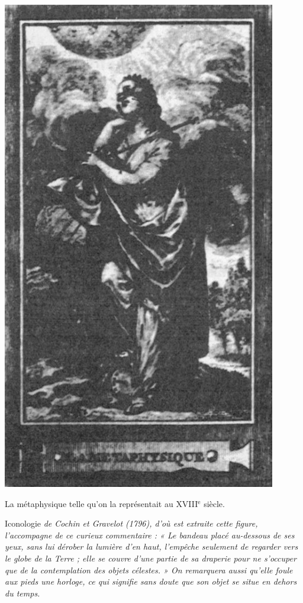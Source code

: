 \vspace{0.44cm}
\begin{minipage}[c]{.45\linewidth}
\begin{center}
\includegraphics[scale=0.3]{./27_metaphysique/092}
\end{center}
\end{minipage}
\hfill
\begin{minipage}[c]{.45\linewidth}
\begin{center}
La métaphysique telle qu'on la représentait au
{\footnotesize XVIII}$^\text{e}$ siècle.
\end{center}
\vspace{0.31cm}

\hspace{0.91cm}{\it L'}Iconologie {\it de Cochin et Gravelot
(1796), d'où est extraite cette figure,
l'accompagne de ce curieux commentaire :
« Le bandeau placé au-dessous
de ses yeux, sans lui dérober la lumière d'en haut,
l'empêche seulement
de regarder vers le globe de la Terre ;
elle se couvre d'une partie de sa draperie
pour ne s'occuper que de la contemplation
des objets célestes. » On
remarquera aussi qu'elle foule aux
pieds une horloge, ce qui signifie sans
doute que son objet se situe en dehors
du temps.}
\end{minipage}

